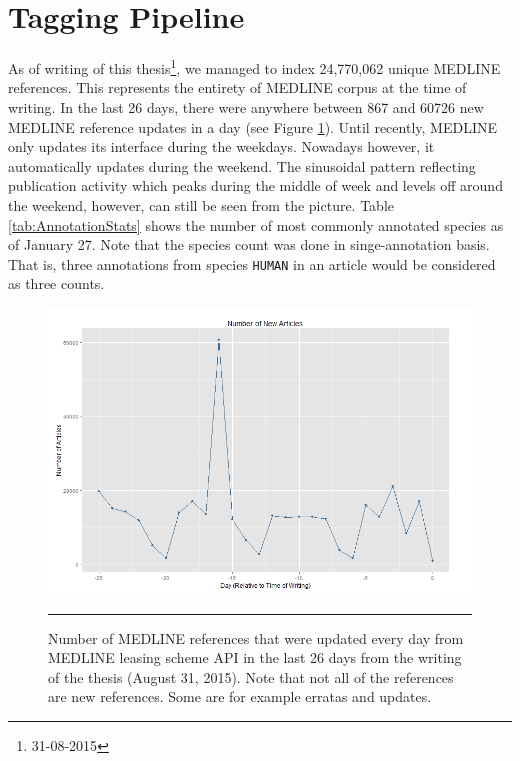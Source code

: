 \section{Tagging Pipeline}

As of writing of this thesis\footnote{31-08-2015}, we managed to index 24,770,062 unique MEDLINE references. This represents the entirety of MEDLINE corpus at the time of writing. In the last 26 days, there were anywhere between 867 and 60726 new MEDLINE reference updates in a day (see Figure \ref{fig:NewArticles}). Until recently, MEDLINE only updates its interface during the weekdays. Nowadays however, it automatically updates during the weekend. The sinusoidal pattern reflecting publication activity which peaks during the middle of week and levels off around the weekend, however, can still be seen from the picture. Table \ref{tab:AnnotationStats} shows the number of most commonly annotated species as of January 27. Note that the species count was done in singe-annotation basis. That is, three annotations from species \texttt{HUMAN} in an article would be considered as three counts.

\begin{figure}[htbp]
	\centering
    \includegraphics[width=6in]{Figures/NewArticles.png}
    \rule{35em}{0.5pt}
  \caption[Number of incoming MEDLINE updates]{Number of MEDLINE references that were updated every day from MEDLINE leasing scheme API in the last 26 days from the writing of the thesis (August 31, 2015). Note that not all of the references are new references. Some are for example erratas and updates.}
  \label{fig:NewArticles}
\end{figure}


